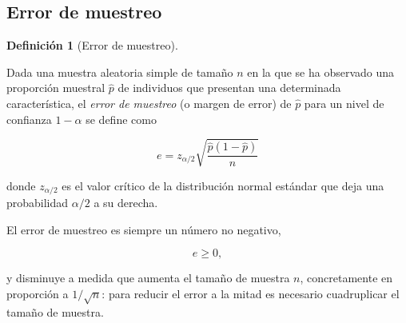 \documentclass[
  spanish,
  a4paper,
]{scrreport}
\theoremstyle{definition}
\theoremstyle{definition}
\newtheorem{definition}{Definición}[chapter]
\theoremstyle{remark}
\begin{document}
\subsection{Error de muestreo}\label{error-de-muestreo}

\begin{definition}[Error de
muestreo]\protect\hypertarget{def-encuestas-error-muestreo}{}\label{def-encuestas-error-muestreo}

Dada una muestra aleatoria simple de tamaño \(n\) en la que se ha
observado una proporción muestral \(\hat p\) de individuos que presentan
una determinada característica, el \emph{error de muestreo} (o margen de
error) de \(\hat p\) para un nivel de confianza \(1-\alpha\) se define
como

\[e = z_{\alpha/2}\sqrt{\frac{\hat p(1-\hat p)}{n}}\]

donde \(z_{\alpha/2}\) es el valor crítico de la distribución normal
estándar que deja una probabilidad \(\alpha/2\) a su derecha.

\end{definition}

\begin{tcolorbox}[enhanced jigsaw, arc=.35mm, bottomrule=.15mm, bottomtitle=1mm, breakable, colback=white, colbacktitle=quarto-callout-important-color!10!white, colframe=quarto-callout-important-color-frame, coltitle=black, left=2mm, leftrule=.75mm, opacityback=0, opacitybacktitle=0.6, rightrule=.15mm, title=\textcolor{quarto-callout-important-color}{\faExclamation}\hspace{0.5em}{Importante}, titlerule=0mm, toprule=.15mm, toptitle=1mm]

El error de muestreo es siempre un número no negativo,

\[e \geq 0,\]

y disminuye a medida que aumenta el tamaño de muestra \(n\),
concretamente en proporción a \(1/\sqrt{n}\): para reducir el error a la
mitad es necesario cuadruplicar el tamaño de muestra.

\end{tcolorbox}
\end{document}
